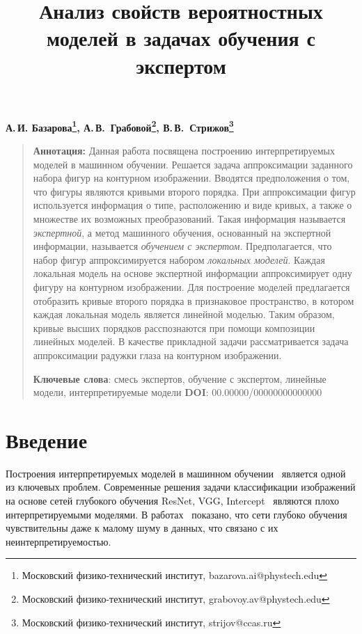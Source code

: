 \documentclass[12pt, twoside]{article}
\numberwithin{equation}{section}
\begin{document}
\title{\bf Анализ свойств вероятностных моделей в задачах обучения с экспертом}
\date{}
\author{}
\maketitle

\begin{center}
\bf
А.\,И. Базарова\footnote{Московский физико-технический институт, bazarova.ai@phystech.edu}, А.\,В.~Грабовой\footnote{Московский физико-технический институт, grabovoy.av@phystech.edu}, В.\,В.~Стрижов\footnote{Московский физико-технический институт, strijov@ccas.ru}

\end{center}

{\centering\begin{quote}
\textbf{Аннотация:} Данная работа посвящена построению интерпретируемых моделей в машинном обучении.
Решается задача аппроксимации заданного набора фигур на контурном изображении.
Вводятся предположения о том, что фигуры являются кривыми второго порядка.
При аппроксимации фигур используется информация о типе, расположению и виде кривых, а также о множестве их возможных преобразований.
Такая информация называется \textit{экспертной}, а метод машинного обучения, основанный на экспертной информации, называется \textit{обучением с экспертом}.
Предполагается, что набор фигур аппроксимируется набором \textit{локальных моделей}.
Каждая локальная модель на основе экспертной информации аппроксимирует одну фигуру на контурном изображении.
Для построение моделей предлагается отобразить кривые второго порядка в признаковое пространство, в котором каждая локальная модель является линейной моделью.
Таким образом, кривые высших порядков расспознаются при помощи композиции линейных моделей.
В качестве прикладной задачи рассматривается задача аппроксимации радужки глаза на контурном изображении.
    
\smallskip
\textbf{Ключевые слова}: смесь экспертов, обучение с экспертом, линейные модели, интерпретируемые модели
\smallskip
\textbf{DOI}: 00.00000/00000000000000
\end{quote}
}

\section{Введение}
Построения интерпретируемых моделей в машинном обучении~\cite{Ribeiro2016} является одной из ключевых проблем.
Современные решения задачи классификации изображений на основе сетей глубокого обучения ResNet, VGG, Intercept~\cite{Kaiming2015} являются плохо интерпретируемыми моделями.
В работах~\cite{Han2020, Xingjun2019, Akhtar2018} показано, что сети глубоко обучения чувствительны даже к малому шуму в данных, что связано с их неинтерпретируемостью.
\end{document}
